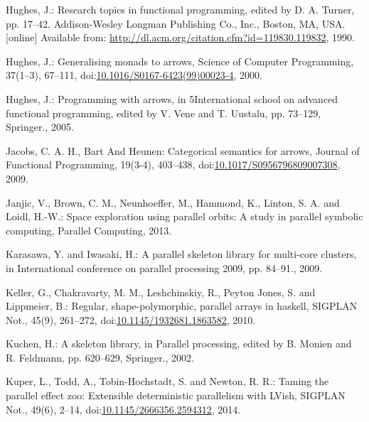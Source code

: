 \documentclass[paper=A4,twoside=true,openright,parskip=full,chapterprefix=true,headings=normal,bibliography=totoc,listof=totoc,titlepage=on,captions=tableabove,draft=false,british]{scrreprt}%
\begin{document}
\leavevmode\hypertarget{ref-Hughes:1990:WFP:119830.119832}{}%
Hughes, J.: Research topics in functional programming, edited by D. A.
Turner, pp. 17--42, Addison-Wesley Longman Publishing Co., Inc., Boston,
MA, USA. {[}online{]} Available from:
\url{http://dl.acm.org/citation.cfm?id=119830.119832}, 1990.

\leavevmode\hypertarget{ref-HughesArrows}{}%
Hughes, J.: Generalising monads to arrows, Science of Computer
Programming, 37(1--3), 67--111,
doi:\href{https://doi.org/10.1016/S0167-6423(99)00023-4}{10.1016/S0167-6423(99)00023-4},
2000.

\leavevmode\hypertarget{ref-Hughes2005}{}%
Hughes, J.: Programming with arrows, in 5International school on
advanced functional programming, edited by V. Vene and T. Uustalu, pp.
73--129, Springer., 2005.

\leavevmode\hypertarget{ref-jacobs_heunen_hasuo_2009}{}%
Jacobs, C. A. H., Bart And Heunen: Categorical semantics for arrows,
Journal of Functional Programming, 19(3-4), 403--438,
doi:\href{https://doi.org/10.1017/S0956796809007308}{10.1017/S0956796809007308},
2009.

\leavevmode\hypertarget{ref-janjic2013space}{}%
Janjic, V., Brown, C. M., Neunhoeffer, M., Hammond, K., Linton, S. A.
and Loidl, H.-W.: Space exploration using parallel orbits: A study in
parallel symbolic computing, Parallel Computing, 2013.

\leavevmode\hypertarget{ref-5361825}{}%
Karasawa, Y. and Iwasaki, H.: A parallel skeleton library for multi-core
clusters, in International conference on parallel processing 2009, pp.
84--91., 2009.

\leavevmode\hypertarget{ref-Keller:2010:RSP:1932681.1863582}{}%
Keller, G., Chakravarty, M. M., Leshchinskiy, R., Peyton Jones, S. and
Lippmeier, B.: Regular, shape-polymorphic, parallel arrays in haskell,
SIGPLAN Not., 45(9), 261--272,
doi:\href{https://doi.org/10.1145/1932681.1863582}{10.1145/1932681.1863582},
2010.

\leavevmode\hypertarget{ref-Kuchen2002}{}%
Kuchen, H.: A skeleton library, in Parallel processing, edited by B.
Monien and R. Feldmann, pp. 620--629, Springer., 2002.

\leavevmode\hypertarget{ref-Kuper:2014:TPE:2666356.2594312}{}%
Kuper, L., Todd, A., Tobin-Hochstadt, S. and Newton, R. R.: Taming the
parallel effect zoo: Extensible deterministic parallelism with LVish,
SIGPLAN Not., 49(6), 2--14,
doi:\href{https://doi.org/10.1145/2666356.2594312}{10.1145/2666356.2594312},
2014.
\end{document}
